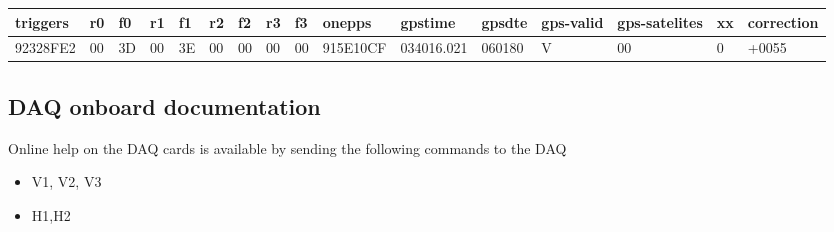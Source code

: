 \documentclass[letterpaper,10pt,english]{sphinxmanual}
\begin{document}
\begin{tabulary}{\linewidth}{|L|L|L|L|L|L|L|L|L|L|L|L|L|L|L|L|}
\hline
\textbf{
triggers
} & \textbf{
r0
} & \textbf{
f0
} & \textbf{
r1
} & \textbf{
f1
} & \textbf{
r2
} & \textbf{
f2
} & \textbf{
r3
} & \textbf{
f3
} & \textbf{
onepps
} & \textbf{
gpstime
} & \textbf{
gpsdte
} & \textbf{
gps-valid
} & \textbf{
gps-satelites
} & \textbf{
xx
} & \textbf{
correction
}\\\hline

92328FE2
 & 
00
 & 
3D
 & 
00
 & 
3E
 & 
00
 & 
00
 & 
00
 & 
00
 & 
915E10CF
 & 
034016.021
 & 
060180
 & 
V
 & 
00
 & 
0
 & 
+0055
\\\hline
\end{tabulary}



\subsection{DAQ onboard documentation}
\label{hardware:daq-onboard-documentation}
Online help on the DAQ cards is available by sending the following commands to the DAQ
\begin{itemize}
\item {} 
V1, V2, V3

\item {} 
H1,H2

\end{itemize}
\end{document}
